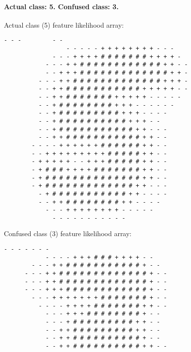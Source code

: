 \begin{multicols*}{2}
\paragraph{Actual class: 5. Confused class: 3. \\}
Actual class (5) feature likelihood array:
\begin{Verbatim}[samepage=true]
                            - - -         - -           
                  - - - - - + + + + + + + + - - -       
              - - - + + + + # # # # # # # + + + + -     
            - - - + + # # # # # # # # # # # # + + - -   
            - - + + + # # # # # # # # # # # # # + + -   
          - - - + + # # # # # # # # # # # # # + + + -   
          - - + + # # # # # # # # # # # + + + + + - -   
          - - + + # # # # # # # + + + + + - - - - -     
          - - + # # # # # # # # + + + - - - - - -       
          - - + # # # # # # # # # + + + - - - -         
          - - + # # # # # # # # # # + + + - -           
          - - + # # # # # # # # # # # + + - - -         
          - - + + # # # # # # # # # # # + + - -         
        - - - - + + + + + + # # # # # # + + - -         
        - - + + + + + + + + + # # # # # + + - -         
        - + + + + + - - + + + # # # # # + + - -         
        - + # # # + + + + # # # # # # # + + - -         
        - + # # # # # # # # # # # # # # + + - -         
        - + # # # # # # # # # # # # # + + - - -         
          - + # # # # # # # # # # # + + - - - -         
          - - + + # # # # # # # # + + - - - -           
            - - - + + + + + + + + - - - - -             
              - - - - - - - - - - -                     
\end{Verbatim}
\columnbreak
Confused class (3) feature likelihood array:
\begin{Verbatim}[samepage=true]
                      - - - - - - -                     
            - - - - + + + # # # + + + + - -             
        - - - + + # # # # # # # # # # # + - -           
      - - - + + # # # # # # # # # # # # # + - -         
      - - - + + # # # # # # # # # # # # # + - -         
      - - - + + + # # # # # # # # # # # # + - -         
        - - - + + + + + + + # # # # # # # + - -         
          - - - - + + + + # # # # # # # + + - -         
            - - - + + + # # # # # # # # + - -           
            - - - + # # # # # # # # # + + - -           
            - - + + # # # # # # # # # + + - -           
            - - + + # # # # # # # # # # + - -           
            - - + + # # # # # # # # # # + + - -         

\end{Verbatim}
\end{multicols*}
